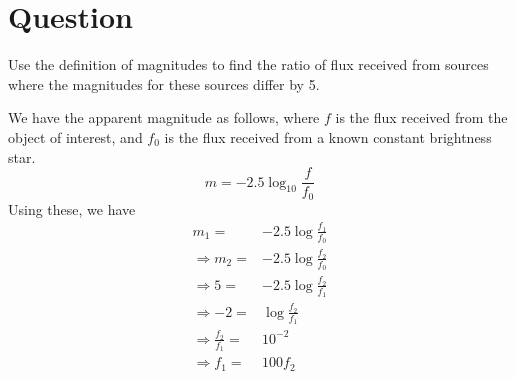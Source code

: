 \documentclass[paper=a4, fontsize=11pt]{scrartcl} %
\numberwithin{equation}{section} %
\numberwithin{figure}{section} %
\numberwithin{table}{section} %
\begin{document}
\section{Question}
	Use the definition of magnitudes to find the ratio of flux received from sources where the magnitudes for these sources differ by 5.\\
	\par
	We have the apparent magnitude as follows, where $f$ is the flux received from the object of interest, and $f_0$ is the flux received from a known constant brightness star.
	\begin{equation}
		m=-2.5\log_{10}{\frac{f}{f_0}}
	\end{equation}
	Using these, we have
	\begin{equation}
	\begin{split}
		m_1= & -2.5\log{\frac{f_1}{f_0}} \\
		\Rightarrow m_2= & -2.5\log{\frac{f_2}{f_0}} \\
		\Rightarrow 5 = & -2.5\log{\frac{f_2}{f_1}} \\
		\Rightarrow -2 = & \log{\frac{f_2}{f_1}} \\
		\Rightarrow \frac{f_2}{f_1}= & 10^{-2} \\
		\Rightarrow f_1= & 100f_2
	\end{split}
	\end{equation}
\end{document}
